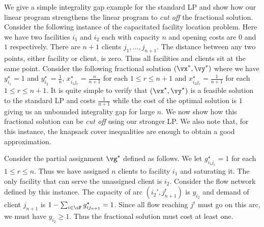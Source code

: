 We give a simple integrality gap example for the standard LP and show how our linear program strengthens the linear program to \emph{cut off} the fractional solution.
Consider the following instance of the capacitated facility location problem. Here we have two facilities $i_1$ and $i_2$ each with capacity $n$ and opening costs are $0$ and $1$ respectively. There are $n+1$ clients $j_1,\ldots,j_{n+1}$. The distance between any two points, either facility or client, is zero. Thus all facilities and clients sit at the same point. Consider the following fractional solution $(\vx^*,\vy^*)$ where we have $y^{\star}_{i_1}=1$ and $y^{\star}_{i_2}=\frac{1}{n}$,  $x^{\star}_{i_1j_r}=\frac{n}{n+1}$ for each $1\leq r \leq n+1$ and $x^{\star}_{i_2j_r}=\frac{1}{n+1}$ for each $1\leq r \leq n+1$. It is quite simple to verify that $(\vx^{\star},\vy^{\star})$ is a feasible solution to the standard LP and costs $\frac{1}{n+1}$ while the cost of the optimal solution is $1$ giving us an unbounded integrality gap for large $n$. We now show how this fractional solution can be \emph{cut off} using our stronger LP. We also note that, for this instance, the knapsack cover inequalities are enough to obtain a good approximation.


Consider the partial assignment $\vg^{\star}$ defined as follows. We let $g^{\star}_{i_1j_r}=1$ for
each $1\leq r\leq n$. Thus we have assigned $n$ clients to facility $i_1$ and saturating it. The
only facility that can serve the unassigned client is $i_2$. Consider the flow network defined by
this instance. The capacity of arc $(i_2',j_{n+1}^t)$ is $y_{i_2}$ and demand of client $j_{n+1}$ is
$1-\sum_{i\in \cF} g^{\star}_{ij_{n+1}}=1$. Since all flow reaching $j^t$ must go on this arc, we
must have $y_{i_2}\geq 1$. Thus the fractional solution must cost at least one.
 

